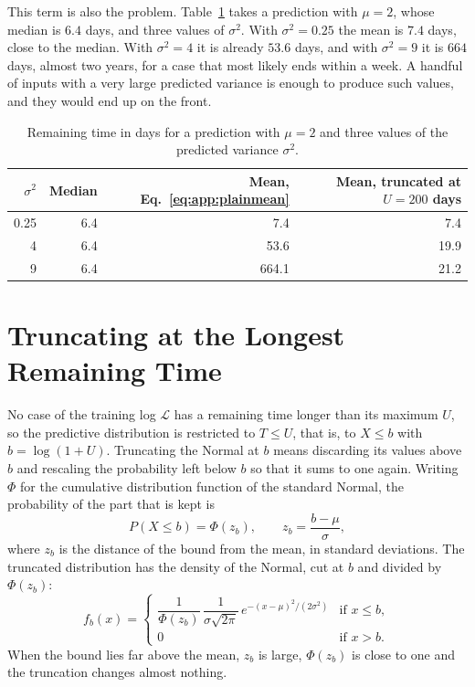 This term is also the problem. Table~\ref{tab:app:example} takes a
prediction with $\mu = 2$, whose median is $6.4$ days, and three values of
$\sigma^2$. With $\sigma^2 = 0.25$ the mean is $7.4$ days, close to the
median. With $\sigma^2 = 4$ it is already $53.6$ days, and with $\sigma^2 = 9$
it is $664$ days, almost two years, for a case that most likely ends within
a week. A handful of inputs with a very large predicted variance is enough to
produce such values, and they would end up on the front.

\begin{table}[h]
  \centering
  \small
  \begin{tabular}{rrrr}
    \toprule
    $\sigma^2$ & Median & Mean, Eq.~\eqref{eq:app:plainmean}
      & Mean, truncated at $U = 200$ days \\
    \midrule
    0.25 & 6.4 &   7.4 &  7.4 \\
    4    & 6.4 &  53.6 & 19.9 \\
    9    & 6.4 & 664.1 & 21.2 \\
    \bottomrule
  \end{tabular}
  \caption{Remaining time in days for a prediction with $\mu = 2$ and three
    values of the predicted variance $\sigma^2$.}
  \label{tab:app:example}
\end{table}

\section{Truncating at the Longest Remaining Time}
No case of the training log $\mathcal{L}$ has a remaining time longer than
its maximum $U$, so the predictive distribution is restricted to
$T \le U$, that is, to $X \le b$ with $b = \log(1 + U)$. Truncating the
Normal at $b$ means discarding its values above $b$ and rescaling the
probability left below $b$ so that it sums to one again. Writing $\Phi$ for
the cumulative distribution function of the standard Normal, the
probability of the part that is kept is
\begin{equation}
  P(X \le b) = \Phi(z_b), \qquad z_b = \frac{b - \mu}{\sigma},
  \label{eq:app:zb}
\end{equation}
where $z_b$ is the distance of the bound from the mean, in standard
deviations. The truncated distribution has the density of the Normal, cut at
$b$ and divided by $\Phi(z_b)$:
\begin{equation}
  f_b(x) =
  \begin{cases}
    \dfrac{1}{\Phi(z_b)}\, \dfrac{1}{\sigma\sqrt{2\pi}}\,
    e^{-(x - \mu)^2 / (2\sigma^2)} & \text{if } x \le b,\\[2ex]
    0 & \text{if } x > b.
  \end{cases}
  \label{eq:app:density}
\end{equation}
When the bound lies far above the mean, $z_b$ is large, $\Phi(z_b)$ is
close to one and the truncation changes almost nothing.

